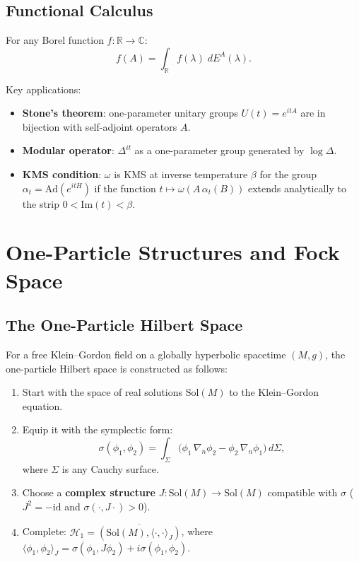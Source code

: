 \documentclass[11pt,a4paper]{article}
\begin{document}
\subsection{Functional Calculus}

For any Borel function $f: \mathbb{R} \to \mathbb{C}$:
\begin{equation}
  f(A) = \int_{\mathbb{R}} f(\lambda)\; dE^A(\lambda).
\end{equation}

Key applications:
\begin{itemize}[nosep]
  \item \textbf{Stone's theorem}: one-parameter unitary groups $U(t) = e^{itA}$
        are in bijection with self-adjoint operators $A$.
  \item \textbf{Modular operator}: $\Delta^{it}$ as a one-parameter group
        generated by $\log\Delta$.
  \item \textbf{KMS condition}: $\omega$ is KMS at inverse temperature $\beta$
        for the group $\alpha_t = \mathrm{Ad}(e^{itH})$ if the function
        $t \mapsto \omega(A\,\alpha_t(B))$ extends analytically to the
        strip $0 < \mathrm{Im}(t) < \beta$.
\end{itemize}

\section{One-Particle Structures and Fock Space}

\subsection{The One-Particle Hilbert Space}

For a free Klein--Gordon field on a globally hyperbolic spacetime $(M, g)$,
the one-particle Hilbert space is constructed as follows:
\begin{enumerate}[nosep]
  \item Start with the space of real solutions $\mathrm{Sol}(M)$ to the
        Klein--Gordon equation.
  \item Equip it with the symplectic form:
        \begin{equation}
          \sigma(\phi_1, \phi_2) = \int_\Sigma \bigl(\phi_1\, \nabla_n \phi_2
          - \phi_2\, \nabla_n \phi_1\bigr)\, d\Sigma,
        \end{equation}
        where $\Sigma$ is any Cauchy surface.
  \item Choose a \textbf{complex structure} $J: \mathrm{Sol}(M) \to \mathrm{Sol}(M)$
        compatible with $\sigma$ ($J^2 = -\mathrm{id}$ and $\sigma(\cdot, J\cdot) > 0$).
  \item Complete: $\mathcal{H}_1 = \overline{(\mathrm{Sol}(M), \langle\cdot,\cdot\rangle_J)}$,
        where $\langle\phi_1, \phi_2\rangle_J = \sigma(\phi_1, J\phi_2) + i\sigma(\phi_1, \phi_2)$.
\end{enumerate}
\end{document}
